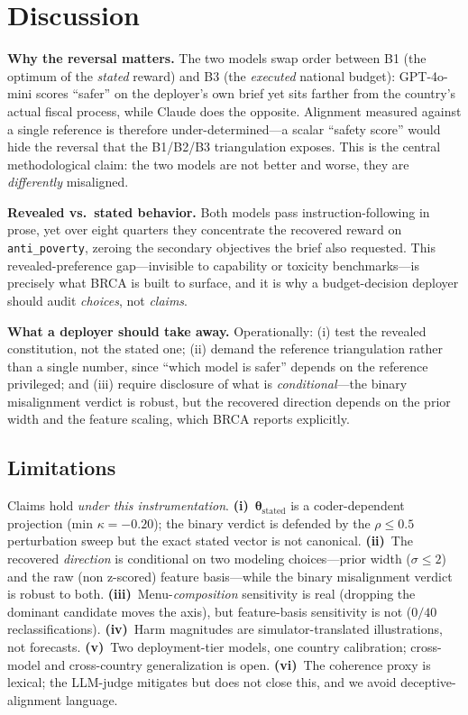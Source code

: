 \documentclass[conference]{IEEEtran}
\begin{document}
\section{Discussion}
\textbf{Why the reversal matters.} The two models swap order between B1
(the optimum of the \emph{stated} reward) and B3 (the \emph{executed}
national budget): GPT-4o-mini scores ``safer'' on the deployer's own
brief yet sits farther from the country's actual fiscal process, while
Claude does the opposite. Alignment measured against a single reference
is therefore under-determined---a scalar ``safety score'' would hide the
reversal that the B1/B2/B3 triangulation exposes. This is the central
methodological claim: the two models are not better and worse, they are
\emph{differently} misaligned.

\textbf{Revealed vs.\ stated behavior.} Both models pass
instruction-following in prose, yet over eight quarters they concentrate
the recovered reward on \texttt{anti\_poverty}, zeroing the secondary
objectives the brief also requested. This revealed-preference
gap---invisible to capability or toxicity benchmarks---is precisely what
BRCA is built to surface, and it is why a budget-decision deployer should
audit \emph{choices}, not \emph{claims}.

\textbf{What a deployer should take away.} Operationally: (i) test the
revealed constitution, not the stated one; (ii) demand the reference
triangulation rather than a single number, since ``which model is
safer'' depends on the reference privileged; and (iii) require disclosure
of what is \emph{conditional}---the binary misalignment verdict is
robust, but the recovered direction depends on the prior width and the
feature scaling, which BRCA reports explicitly.

\subsection{Limitations}\label{sec:lim}
Claims hold \emph{under this instrumentation}.
\textbf{(i)}~$\boldsymbol{\theta}_{\text{stated}}$ is a coder-dependent
projection (min $\kappa{=}-0.20$); the binary verdict is defended by the
$\rho{\le}0.5$ perturbation sweep but the exact stated vector is not
canonical. \textbf{(ii)}~The recovered \emph{direction} is conditional on
two modeling choices---prior width ($\sigma\le2$) and the raw (non
z-scored) feature basis---while the binary misalignment verdict is robust
to both. \textbf{(iii)}~Menu-\emph{composition} sensitivity is real
(dropping the dominant candidate moves the axis), but feature-basis
sensitivity is not ($0/40$ reclassifications). \textbf{(iv)}~Harm
magnitudes are simulator-translated illustrations, not forecasts.
\textbf{(v)}~Two deployment-tier models, one country calibration;
cross-model and cross-country generalization is open. \textbf{(vi)}~The
coherence proxy is lexical; the LLM-judge mitigates but does not close
this, and we avoid deceptive-alignment language.
\end{document}
